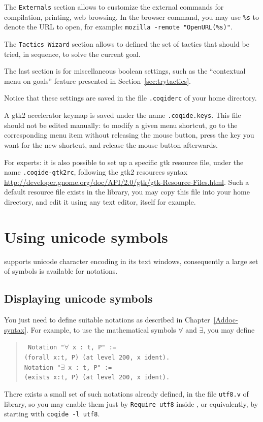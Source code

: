 The \verb|Externals| section allows to customize the external commands
for compilation, printing, web browsing. In the browser command, you
may use \verb|%s| to denote the URL to open, for example: %
\verb|mozilla -remote "OpenURL(%s)"|. 

The \verb|Tactics Wizard| section allows to defined the set of tactics
that should be tried, in sequence, to solve the current goal.

The last section is for miscellaneous boolean settings, such as the
``contextual menu on goals'' feature presented in
Section~\ref{sec:trytactics}. 

Notice that these settings are saved in the file \verb|.coqiderc| of
your home directory. 

A gtk2 accelerator keymap is saved under the name \verb|.coqide.keys|.
This file should not be edited manually: to modify a given menu
shortcut, go to the corresponding menu item without releasing the
mouse button, press the key you want for the new shortcut, and release
the mouse button afterwards.

For experts: it is also possible to set up a specific gtk resource
file, under the name \verb|.coqide-gtk2rc|, following the gtk2
resources syntax
\url{http://developer.gnome.org/doc/API/2.0/gtk/gtk-Resource-Files.html}.
Such a default resource file exists in the \Coq{} library, you may
copy this file into your home directory, and edit it using any text
editor, \CoqIDE{} itself for example.

\section{Using unicode symbols}

\CoqIDE{} supports unicode character encoding in its text windows,
consequently a large set of symbols is available for notations.

\subsection{Displaying unicode symbols}

You just need to define suitable notations as described in
Chapter~\ref{Addoc-syntax}. For example, to use the mathematical symbols
$\forall$ and $\exists$, you may define 
\begin{quote}\tt
Notation "$\forall$ x : t, P" := \\
\qquad  (forall x:t, P) (at level 200, x ident).\\
Notation "$\exists$ x : t, P" := \\
\qquad  (exists x:t, P) (at level 200, x ident).
\end{quote}
There exists a small set of such notations already defined, in the
file \verb|utf8.v| of \Coq{} library, so you may enable them just by 
\verb|Require utf8| inside \CoqIDE{}, or equivalently, by starting
\CoqIDE{} with \verb|coqide -l utf8|.

